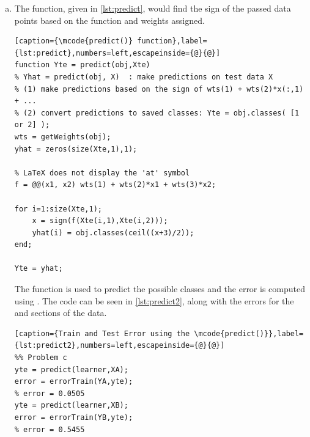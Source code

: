 \documentclass[a4paper, 11pt]{article}
\begin{document}
\begin{enumerate}[(a)]
\begin{lstlisting}[caption={The \mcode{plot2DLinear()}},label={lst:plot2d1},numbers=left,escapeinside={@}{@}]
%%% TODO: Fill in the rest of this function...
wts = getWeights(obj);
% LaTeX does not display the 'at' symbol
f = @@(x1, x2) wts(1) + wts(2)*x1 +wts(3)*x2;

scatter(X(:,1),X(:,2),50,Y,'filled');
hold on;
ezplot(f,[-3,3])
hold off;
\end{lstlisting}

\vspace{-25pt}
\begin{lstlisting}[caption={plotting using \mcode{plot2DLinear()}},label={lst:plot2d2},numbers=left,escapeinside={@}{@}]
%% Problem b
learner = logisticClassify2();
learner=setClasses(learner, unique(YA));
wts = [.5 1 -.25];
learner=setWeights(learner, wts);

h=figure;
plot2DLinear(learner,XA,YA);
saveas(h,'log1.jpg','jpg');

h=figure;
plot2DLinear(learner,XB,YB);
saveas(h,'log2.jpg','jpg');
\end{lstlisting}

\item The  function, given in \autoref{lst:predict}, would find the sign of the passed data points based on the function and weights assigned.
\vspace{-25pt}
\begin{lstlisting}[caption={\mcode{predict()} function},label={lst:predict},numbers=left,escapeinside={@}{@}]
function Yte = predict(obj,Xte)
% Yhat = predict(obj, X)  : make predictions on test data X
% (1) make predictions based on the sign of wts(1) + wts(2)*x(:,1) + ...
% (2) convert predictions to saved classes: Yte = obj.classes( [1 or 2] );
wts = getWeights(obj);
yhat = zeros(size(Xte,1),1);

% LaTeX does not display the 'at' symbol
f = @@(x1, x2) wts(1) + wts(2)*x1 + wts(3)*x2;

for i=1:size(Xte,1);
    x = sign(f(Xte(i,1),Xte(i,2)));
    yhat(i) = obj.classes(ceil((x+3)/2));
end;

Yte = yhat;
\end{lstlisting}
The  function is used to predict the possible classes and the error is computed using . The code can be seen in \autoref{lst:predict2}, along with the errors for the  and  sections of the data.
\vspace{-25pt}
\begin{lstlisting}[caption={Train and Test Error using the \mcode{predict()}},label={lst:predict2},numbers=left,escapeinside={@}{@}]
%% Problem c
yte = predict(learner,XA);
error = errorTrain(YA,yte);
% error = 0.0505
yte = predict(learner,XB);
error = errorTrain(YB,yte);
% error = 0.5455
\end{lstlisting}


\end{enumerate}
\end{document}
